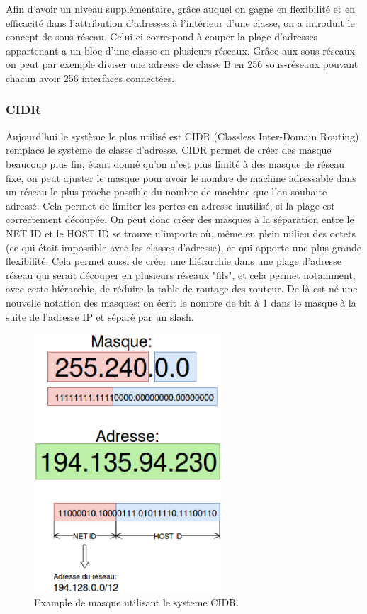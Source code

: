 Afin d'avoir un niveau supplémentaire, grâce auquel on gagne en flexibilité et
en efficacité dans l'attribution d'adresses à l'intérieur d'une classe, on a
introduit le concept de sous-réseau. Celui-ci correspond à couper la plage
d'adresses appartenant a un bloc d'une classe en plusieurs réseaux. Grâce aux
sous-réseaux on peut par exemple diviser une adresse de classe B en 256
sous-réseaux pouvant chacun avoir 256 interfaces connectées. 


\subsubsection{CIDR}

Aujourd'hui le système le plus utilisé est CIDR (Classless Inter-Domain
Routing) remplace le système de classe d'adresse. CIDR permet de créer des
masque beaucoup plus fin, étant donné qu'on n'est plus limité à des masque de
réseau fixe, on peut ajuster le masque pour avoir le nombre de machine
adressable dans un réseau le plus proche possible du nombre de machine que l'on
souhaite adressé.  Cela permet de limiter les pertes en adresse inutilisé, si
la plage est correctement découpée.  On peut donc créer des masques à la
séparation entre le NET ID et le HOST ID se trouve n'importe où, même en plein
milieu des octets (ce qui était impossible avec les classes d'adresse), ce qui
apporte une plus grande flexibilité.  Cela permet aussi de créer une hiérarchie
dans une plage d'adresse réseau qui serait découper en plusieurs réseaux
"fils", et cela permet notamment, avec cette hiérarchie, de réduire la table de
routage des routeur.  De là est né une nouvelle notation des masques: on écrit
le nombre de bit à 1 dans le masque à la suite de l'adresse IP et séparé par un
slash.


\begin{figure}[h]
\centering
\includegraphics[width=7cm]{./pics/maskipv4cidr.eps}
\caption{Example de masque utilisant le systeme CIDR.}
\label{fig:exmask}
\end{figure}


